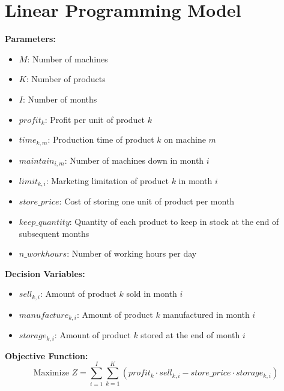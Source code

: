 \documentclass{article}
\begin{document}
\section*{Linear Programming Model}

\textbf{Parameters:}
\begin{itemize}
    \item $M$: Number of machines
    \item $K$: Number of products
    \item $I$: Number of months
    \item $profit_k$: Profit per unit of product $k$ 
    \item $time_{k,m}$: Production time of product $k$ on machine $m$
    \item $maintain_{i,m}$: Number of machines down in month $i$
    \item $limit_{k,i}$: Marketing limitation of product $k$ in month $i$
    \item $store\_price$: Cost of storing one unit of product per month
    \item $keep\_quantity$: Quantity of each product to keep in stock at the end of subsequent months
    \item $n\_workhours$: Number of working hours per day
\end{itemize}

\textbf{Decision Variables:}
\begin{itemize}
    \item $sell_{k,i}$: Amount of product $k$ sold in month $i$
    \item $manufacture_{k,i}$: Amount of product $k$ manufactured in month $i$
    \item $storage_{k,i}$: Amount of product $k$ stored at the end of month $i$
\end{itemize}

\textbf{Objective Function:}
\[
\text{Maximize } Z = \sum_{i=1}^{I} \sum_{k=1}^{K} \left( profit_k \cdot sell_{k,i} - store\_price \cdot storage_{k,i} \right)
\]
\end{document}
